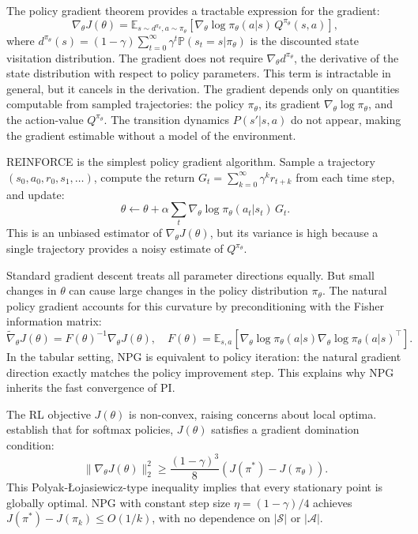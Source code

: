 The policy gradient theorem \citep{SuttonMcAllester2000} provides a tractable expression for the gradient:
\begin{equation}
\nabla_\theta J(\theta) = \mathbb{E}_{s \sim d^{\pi_\theta}, a \sim \pi_\theta} \left[ \nabla_\theta \log \pi_\theta(a|s) \, Q^{\pi_\theta}(s,a) \right],
\label{eq:policy_gradient}
\end{equation}
where $d^{\pi_\theta}(s) = (1-\gamma) \sum_{t=0}^\infty \gamma^t \mathbb{P}(s_t = s | \pi_\theta)$ is the discounted state visitation distribution. The gradient does not require $\nabla_\theta d^{\pi_\theta}$, the derivative of the state distribution with respect to policy parameters. This term is intractable in general, but it cancels in the derivation. The gradient depends only on quantities computable from sampled trajectories: the policy $\pi_\theta$, its gradient $\nabla_\theta \log \pi_\theta$, and the action-value $Q^{\pi_\theta}$. The transition dynamics $P(s'|s,a)$ do not appear, making the gradient estimable without a model of the environment.

REINFORCE \citep{williams1992} is the simplest policy gradient algorithm. Sample a trajectory $(s_0, a_0, r_0, s_1, \ldots)$, compute the return $G_t = \sum_{k=0}^\infty \gamma^k r_{t+k}$ from each time step, and update:
\begin{equation}
\theta \leftarrow \theta + \alpha \sum_t \nabla_\theta \log \pi_\theta(a_t|s_t) \, G_t.
\end{equation}
This is an unbiased estimator of $\nabla_\theta J(\theta)$, but its variance is high because a single trajectory provides a noisy estimate of $Q^{\pi_\theta}$.

Standard gradient descent treats all parameter directions equally. But small changes in $\theta$ can cause large changes in the policy distribution $\pi_\theta$. The natural policy gradient \citep{Kakade2001} accounts for this curvature by preconditioning with the Fisher information matrix:
\begin{equation}
\tilde{\nabla}_\theta J(\theta) = F(\theta)^{-1} \nabla_\theta J(\theta), \quad F(\theta) = \mathbb{E}_{s,a} \left[ \nabla_\theta \log \pi_\theta(a|s) \nabla_\theta \log \pi_\theta(a|s)^\top \right].
\end{equation}
In the tabular setting, NPG is equivalent to policy iteration: the natural gradient direction exactly matches the policy improvement step. This explains why NPG inherits the fast convergence of PI.

The RL objective $J(\theta)$ is non-convex, raising concerns about local optima. \citet{agarwal2021theory} establish that for softmax policies, $J(\theta)$ satisfies a gradient domination condition:
\begin{equation}
\|\nabla_\theta J(\theta)\|_2^2 \geq \frac{(1-\gamma)^3}{8} \left( J(\pi^*) - J(\pi_\theta) \right).
\end{equation}
This Polyak-\L{}ojasiewicz-type inequality implies that every stationary point is globally optimal. NPG with constant step size $\eta = (1-\gamma)/4$ achieves $J(\pi^*) - J(\pi_k) \leq O(1/k)$, with no dependence on $|\mathcal{S}|$ or $|\mathcal{A}|$.

